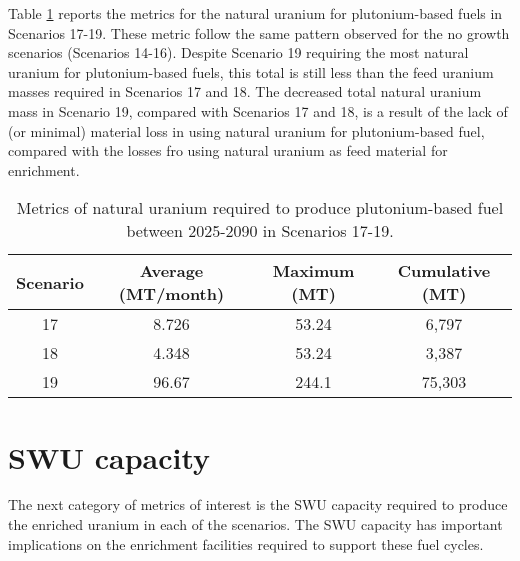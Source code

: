Table \ref{tab:s17-19_natU} reports the metrics for the 
natural uranium for plutonium-based fuels in Scenarios 17-19. 
These metric follow the same pattern observed for the 
no growth scenarios (Scenarios 14-16). Despite Scenario 19 
requiring the most natural uranium for plutonium-based 
fuels, this total is still less than the feed uranium 
masses required in Scenarios 17 and 18. The decreased total 
natural uranium mass in Scenario 19, compared with Scenarios 
17 and 18, is a result of the lack of (or minimal) material loss in 
using natural uranium for plutonium-based fuel, compared with 
the losses fro using natural uranium as feed material for 
enrichment. 

\begin{table}[h!]
    \centering 
    \caption{Metrics of natural uranium required to produce 
    plutonium-based fuel between 2025-2090 in Scenarios 
    17-19.}
    \label{tab:s17-19_natU}
    \begin{tabular}{c c c c}
        \hline 
        Scenario & Average (MT/month) & Maximum (MT) & Cumulative (MT) \\
        \hline
        17 & 8.726 & 53.24 & 6,797\\
        18 & 4.348 & 53.24 & 3,387\\
        19 & 96.67 & 244.1 & 75,303\\
        \hline
    \end{tabular}
\end{table}


\section{SWU capacity}
The next category of metrics of interest is the \gls{SWU} capacity required 
to produce the enriched uranium in each of the scenarios. The \gls{SWU} 
capacity has important implications on the enrichment facilities required 
to support these fuel cycles. 

